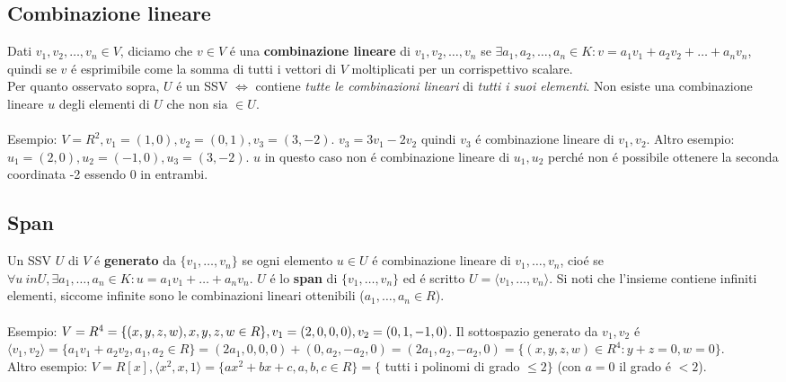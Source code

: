 \documentclass{article}
\begin{document}
\subsection{Combinazione lineare}
Dati $v_1, v_2, \dots, v_n \in V$, diciamo che $v \in V$ é una \textbf{combinazione lineare} di $v_1, v_2, \dots, v_n$ se $\exists a_1, a_2, \dots, a_n \in K : v = a_1 v_1 + a_2 v_2 + \dots + a_n v_n$, quindi se $v$ é esprimibile come la somma di tutti i vettori di $V$ moltiplicati per un corrispettivo scalare.\\
Per quanto osservato sopra, $U$ é un SSV $\iff$ contiene \textit{tutte le combinazioni lineari} di \textit{tutti i suoi elementi}. Non esiste una combinazione lineare $u$ degli elementi di $U$ che non sia $\in U$.\\\\
Esempio: $V = R^2, v_1 = (1,0), v_2 = (0,1), v_3 = (3, -2)$. $v_3 = 3v_1 -2v_2$ quindi $v_3$ é combinazione lineare di $v_1, v_2$. Altro esempio: $u_1 = (2,0), u_2 = (-1, 0), u_3 = (3, -2)$. $u$ in questo caso non é combinazione lineare di $u_1, u_2$ perché non é possibile ottenere la seconda coordinata -2 essendo 0 in entrambi.

\subsection{Span}
Un SSV $U$ di $V$ é \textbf{generato} da $\{v_1, \dots, v_n\}$ se ogni elemento $u \in U$ é combinazione lineare di $v_1, \dots, v_n$, cioé se $\forall u \ in U, \exists a_1, \dots, a_n \in K : u = a_1 v_1 + \dots + a_n v_n$. $U$ é lo \textbf{span} di $\{v_1, \dots, v_n\}$ ed é scritto $U = \langle v_1, \dots, v_n \rangle$. Si noti che l'insieme contiene infiniti elementi, siccome infinite sono le combinazioni lineari ottenibili ($a_1, \dots, a_n \in R$).\\\\
Esempio: $
V = R^4 = \{(x,y,z,w), x,y,z,w \in R\}, \\
v_1 = (2,0,0,0), v_2 = (0,1,-1,0)
$. Il sottospazio generato da $v_1, v_2$ é $\langle v_1, v_2 \rangle = \{a_1 v_1 + a_2 v_2, a_1, a_2 \in R\} = (2a_1,0,0,0) + (0,a_2,-a_2,0) = (2a_1,a_2,-a_2,0) = \{(x,y,z,w) \in R^4 : y + z = 0, w = 0\}$.\\
Altro esempio: $V = R[x], \langle x^2, x, 1 \rangle = \{ax^2+bx+c, a,b,c \in R\} = \{$ tutti i polinomi di grado $\leq 2\}$ (con $a=0$ il grado é $< 2$).
\end{document}
